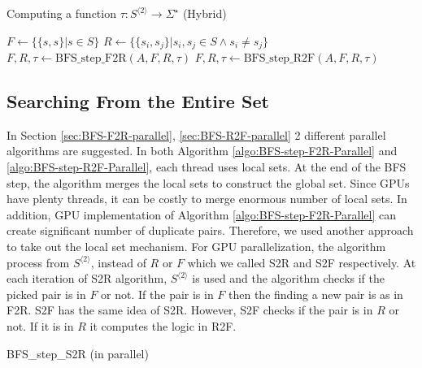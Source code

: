 \documentclass[12pt]{article}
\begin{document}
\begin{algorithm}[ht]
	\label{algo:BFS-Hybrid}
	\caption{Computing a function $\tau : S^{\langle 2 \rangle} \rightarrow \Sigma^\star$ (Hybrid)}
	
	

	
	$F \longleftarrow \{ \{ s,s \} | s \in S \}$\;
	$R \longleftarrow \{ \{ s_i,s_j \} | s_i,s_j \in S \wedge s_i \neq s_j \}$\;
	{
		{
			$F,R,\tau \longleftarrow \mbox{BFS\_step\_F2R}(A,F,R,\tau)$\;
		}
		\Else
		{
			$F,R,\tau \longleftarrow \mbox{BFS\_step\_R2F}(A,F,R,\tau)$\;
		}
	}
\end{algorithm}

\subsection{Searching From the Entire Set}
\label{sec:BFS-entire-set}
In Section \ref{sec:BFS-F2R-parallel}, \ref{sec:BFS-R2F-parallel} 2 different parallel algorithms are suggested. In both Algorithm \ref{algo:BFS-step-F2R-Parallel} and \ref{algo:BFS-step-R2F-Parallel}, each thread uses local sets. At the end of the BFS step, the algorithm merges the local sets to construct the global set. Since GPUs have plenty threads, it can be costly to merge enormous number of local sets. In addition, GPU implementation of Algorithm \ref{algo:BFS-step-F2R-Parallel} can create significant number of duplicate pairs. Therefore, we used another approach to take out the local set mechanism. For GPU parallelization, the algorithm process from $S^{\langle 2 \rangle}$, instead of $R$ or $F$ which we called S2R and S2F respectively. At each iteration of S2R algorithm, $S^{\langle 2 \rangle}$ is used and the algorithm checks if the picked pair is in $F$ or not. If the pair is in $F$ then the finding a new pair is as in F2R. S2F has the same idea of S2R. However, S2F checks if the pair is in $R$ or not. If it is in $R$ it computes the logic in R2F. 

\begin{algorithm}[ht]
	\label{algo:BFS-step-S2R-Parallel}
	\caption{BFS\_step\_S2R (in parallel)}
	
	
	{
	}
	
\end{algorithm}
\end{document}
